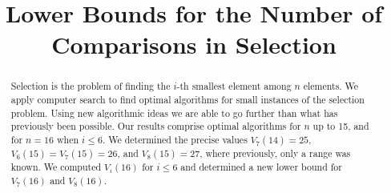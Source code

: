 \documentclass[twoside,leqno,twocolumn]{article}
\begin{document}
%
\newcommand\relatedversion{}



\title{\Large Lower Bounds for the Number of Comparisons in Selection\relatedversion}


\date{}

\maketitle







\begin{abstract} \small\baselineskip=9pt
  Selection is the problem of finding the $i$-th smallest element among $n$ elements.
  We apply computer search to find optimal algorithms for small instances of the selection problem.
  Using new algorithmic ideas we are able to go further than what has previously been possible.
  Our results comprise optimal algorithms for $n$ up to 15, and for $n=16$ when $i \leq 6$.
  We determined the precise values $V_7(14) = 25$, $V_6(15) = V_7(15) = 26$, and $V_8(15) = 27$, where previously, only a range was known.
  We computed $V_i(16)$ for $i \leq 6$ and determined a new lower bound for $V_7(16)$ and $V_8(16)$.

\end{abstract} %
\end{document}
